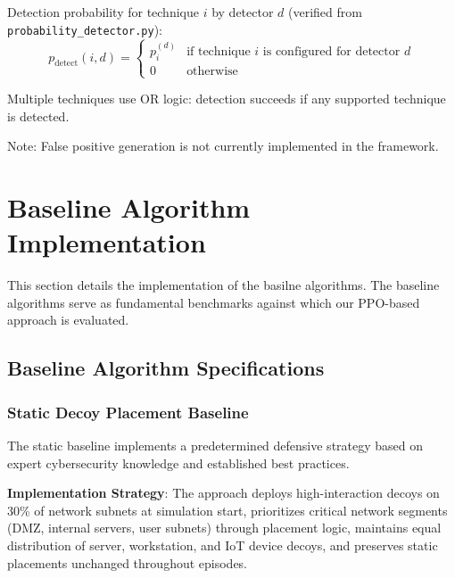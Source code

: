 \documentclass[12pt,oneside]{article}
\begin{document}
Detection probability for technique $i$ by detector $d$ (verified from \texttt{probability\_detector.py}):
\begin{equation}
p_{\text{detect}}(i, d) = \begin{cases}
p_i^{(d)} & \text{if technique } i \text{ is configured for detector } d \\
0 & \text{otherwise}
\end{cases}
\end{equation}

Multiple techniques use OR logic: detection succeeds if any supported technique is detected.

Note: False positive generation is not currently implemented in the framework.


\clearpage

\section{Baseline Algorithm Implementation}

This section details the implementation of the basilne algorithms. The baseline algorithms serve as fundamental benchmarks against which our PPO-based approach is evaluated.

\subsection{Baseline Algorithm Specifications}

\subsubsection{Static Decoy Placement Baseline}

The static baseline implements a predetermined defensive strategy based on expert cybersecurity knowledge and established best practices.

\textbf{Implementation Strategy}: The approach deploys high-interaction decoys on 30\% of network subnets at simulation start, prioritizes critical network segments (DMZ, internal servers, user subnets) through placement logic, maintains equal distribution of server, workstation, and IoT device decoys, and preserves static placements unchanged throughout episodes.
\end{document}

